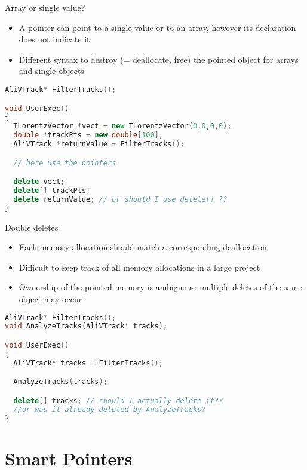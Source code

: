 \documentclass[xcolor={usenames,dvipsnames}]{beamer}
\begin{document}
\begin{frame}[fragile]{Array or single value?}
\begin{itemize}
\item A pointer can point to a single value or to an array, however its declaration does not indicate it
\item Different syntax to destroy (= deallocate, free) the pointed object for arrays and single objects 
\end{itemize}
\scriptsize
\begin{lstlisting}[language=C++]
AliVTrack* FilterTracks();

void UserExec()
{
  TLorentzVector *vect = new TLorentzVector(0,0,0,0);
  double *trackPts = new double[100];
  AliVTrack *returnValue = FilterTracks();

  // here use the pointers

  delete vect;
  delete[] trackPts;
  delete returnValue; // or should I use delete[] ??
}
\end{lstlisting}
\end{frame}

\begin{frame}[fragile]{Double deletes}
\begin{itemize}
\item Each memory allocation should match a corresponding deallocation
\item Difficult to keep track of all memory allocations in a large project
\item Ownership of the pointed memory is ambiguous: multiple deletes of the same object may occur
\end{itemize}
\scriptsize
\begin{lstlisting}[language=C++]
AliVTrack* FilterTracks();
void AnalyzeTracks(AliVTrack* tracks);

void UserExec()
{
  AliVTrack* tracks = FilterTracks();

  AnalyzeTracks(tracks);

  delete[] tracks; // should I actually delete it?? 
  //or was it already deleted by AnalyzeTracks?
}
\end{lstlisting}
\end{frame}

\section{Smart Pointers}
\end{document}
